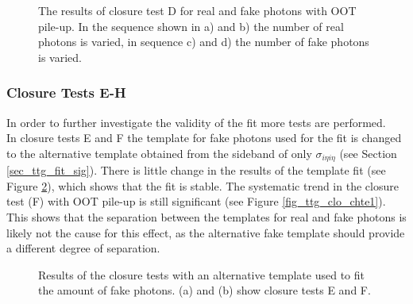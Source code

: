 \begin{figure}[ht]
  \caption{The results of closure test D for real and fake photons with OOT pile-up. In the sequence shown in a) and b) the number of real photons is varied, in sequence c) and d) the number of fake photons is varied.}
  \label{fig_ttg_clo_seqoot}
\end{figure}
\FloatBarrier

\subsubsection{Closure Tests E-H}
\label{sec_ttg_clo_test}

In order to further investigate the validity of the fit more tests are performed.\\
In closure tests E and F the template for fake photons used for the fit is changed to the alternative template obtained from the sideband of only $\sigma_{i \eta i \eta}$ (see Section \ref{sec_ttg_fit_sig}). There is little change in the results of the template fit (see Figure \ref{fig_ttg_clo_chte}), which shows that the fit is stable. The systematic trend in the closure test (F) with OOT pile-up is still significant (see Figure \ref{fig_ttg_clo_chte1}). This shows that the separation between the templates for real and fake photons is likely not the cause for this effect, as the alternative fake template should provide a different degree of separation.\\

\begin{figure}[ht]
  \caption{Results of the closure tests with an alternative template used to fit the amount of fake photons. (a) and (b) show closure tests E and F.}
  \label{fig_ttg_clo_chte}
\end{figure}

